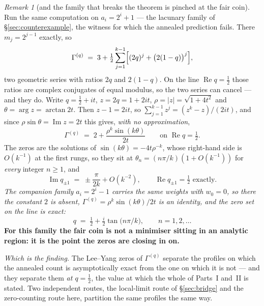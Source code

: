 \documentclass[11pt,a4paper]{article}
\theoremstyle{plain}
\theoremstyle{definition}
\theoremstyle{remark}
\newtheorem{remark}[theorem]{Remark}
\begin{document}
\begin{remark}[and the family that breaks the theorem is pinched at the fair coin]\label{rem:leeyanglacunary}
Run the same computation on $a_i=2^{i}+1$ --- the lacunary family of
\S\ref{sec:counterexample}, the witness for which the annealed prediction fails. There
$m_j=2^{j-1}$ exactly, so
\[
  \Gamma^{(q)}\;=\;3+\tfrac12\sum_{j=1}^{k-1}\Bigl[(2q)^{j}+\bigl(2(1-q)\bigr)^{j}\Bigr],
\]
two geometric series with ratios $2q$ and $2(1-q)$. On the line $\operatorname{Re}q=\tfrac12$
those ratios are complex conjugates of equal modulus, so the two series can cancel --- and they
do. Write $q=\tfrac12+it$, $z=2q=1+2it$, $\rho=|z|=\sqrt{1+4t^{2}}$ and
$\theta=\arg z=\arctan 2t$. Then $z-1=2it$, so $\sum_{j=1}^{k-1}z^{j}=(z^{k}-z)/(2it)$, and
since $\rho\sin\theta=\operatorname{Im}z=2t$ this gives, \emph{with no approximation},
\[
  \Gamma^{(q)}\;=\;2+\frac{\rho^{k}\sin (k\theta)}{2t}
  \qquad\text{on }\operatorname{Re}q=\tfrac12 .
\]
The zeros are the solutions of $\sin (k\theta)=-4t\rho^{-k}$, whose right-hand side is
$O(k^{-1})$ at the first rungs, so they sit at $\theta_{n}=(n\pi/k)(1+O(k^{-1}))$ for
\emph{every} integer $n\ge1$, and
\[
  \operatorname{Im}q_{\pm1}\;=\;\pm\frac{\pi}{2k}+O(k^{-2}),
  \qquad \operatorname{Re}q_{\pm1}=\tfrac12 \text{ exactly}.
\]
\emph{The companion family $a_i=2^{i}-1$ carries the same weights with $w_{0}=0$, so there the
constant $2$ is absent, $\Gamma^{(q)}=\rho^{k}\sin (k\theta)/2t$ is an identity, and the zero set
on the line is exact:}
\[
  q\;=\;\tfrac12+\tfrac{i}{2}\tan\bigl(n\pi/k\bigr),\qquad n=1,2,\dots
\]
\textbf{For this family the fair coin is not a minimiser sitting in an analytic region: it is
the point the zeros are closing in on.}

\emph{Which is the finding.} The Lee--Yang zeros of $\Gamma^{(q)}$ separate the profiles on
which the annealed count is asymptotically exact from the one on which it is not --- and they
separate them \emph{at $q=\tfrac12$}, the value at which the whole of Parts~I and~II is stated.
Two independent routes, the local-limit route of \S\ref{sec:bridge} and the zero-counting route
here, partition the same profiles the same way.


\end{remark}
\end{document}
